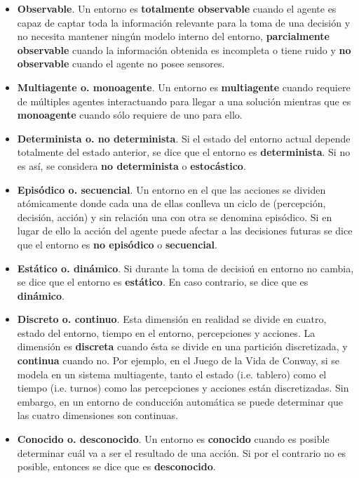 \begin{itemize}
	\item \textbf{Observable}. Un entorno es \textbf{totalmente observable} cuando el agente es capaz de captar toda la información relevante para la toma de una decisión y no necesita mantener ningún modelo interno del entorno, \textbf{parcialmente observable} cuando la información obtenida es incompleta o tiene ruido y \textbf{no observable} cuando el agente no posee sensores.
	\item \textbf{Multiagente o. monoagente}. Un entorno es \textbf{multiagente} cuando requiere de múltiples agentes interactuando para llegar a una solución mientras que es \textbf{monoagente} cuando sólo requiere de uno para ello.
	\item \textbf{Determinista o. no determinista}. Si el estado del entorno actual depende totalmente del estado anterior, se dice que el entorno es \textbf{determinista}. Si no es así, se considera \textbf{no determinista} o \textbf{estocástico}.
	\item \textbf{Episódico o. secuencial}. Un entorno en el que las acciones se dividen atómicamente donde cada una de ellas conlleva un ciclo de (percepción, decisión, acción) y sin relación una con otra se denomina episódico. Si en lugar de ello la acción del agente puede afectar a las decisiones futuras se dice que el entorno es \textbf{no episódico} o \textbf{secuencial}.
	\item \textbf{Estático o. dinámico}. Si durante la toma de decisioń en entorno no cambia, se dice que el entorno es \textbf{estático}. En caso contrario, se dice que es \textbf{dinámico}.
	\item \textbf{Discreto o. continuo}. Esta dimensión en realidad se divide en cuatro, estado del entorno, tiempo en el entorno, percepciones y acciones. La dimensión es \textbf{discreta} cuando ésta se divide en una partición discretizada, y \textbf{continua} cuando no. Por ejemplo, en el Juego de la Vida de Conway, si se modela en un sistema multiagente, tanto el estado (i.e. tablero) como el tiempo (i.e. turnos) como las percepciones y acciones están discretizadas. Sin embargo, en un entorno de conducción automática se puede determinar que las cuatro dimensiones son continuas.
	\item \textbf{Conocido o. desconocido}. Un entorno es \textbf{conocido} cuando es posible determinar cuál va a ser el resultado de una acción. Si por el contrario no es posible, entonces se dice que es \textbf{desconocido}.
\end{itemize}

